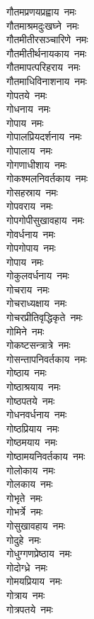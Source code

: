 \begin{multicols}{2}
\begin{flushleft}
गौतमप्रणयप्रह्वाय~नमः\\
गौतमाश्रमदुःखघ्ने~नमः\\
गौतमीतीरसञ्चारिणे~नमः\\
गौतमीतीर्थनायकाय~नमः\\
गौतमापत्परिहराय~नमः\\
गौतमाधिविनाशनाय~नमः\\
गोपतये~नमः\hfill{}\\
गोधनाय~नमः\\
गोपाय~नमः\\
गोपालप्रियदर्शनाय~नमः\\
गोपालाय~नमः\\
गोगणाधीशाय~नमः\\
गोकश्मलनिवर्तकाय~नमः\\
गोसहस्राय~नमः\\
गोपवराय~नमः\\
गोपगोपीसुखावहाय~नमः\\
गोवर्धनाय~नमः\hfill{}\\
गोपगोपाय~नमः\\
गोपाय~नमः\\
गोकुलवर्धनाय~नमः\\
गोचराय~नमः\\
गोचराध्यक्षाय~नमः\\
गोचरप्रीतिवृद्धिकृते~नमः\\
गोमिने~नमः\\
गोकष्टसन्त्रात्रे~नमः\\
गोसन्तापनिवर्तकाय~नमः\\
गोष्ठाय~नमः\hfill{}\\
गोष्ठाश्रयाय~नमः\\
गोष्ठपतये~नमः\\
गोधनवर्धनाय~नमः\\
गोष्ठप्रियाय~नमः\\
गोष्ठमयाय~नमः\\
गोष्ठामयनिवर्तकाय~नमः\\
गोलोकाय~नमः\\
गोलकाय~नमः\\
गोभृते~नमः\\
गोभर्त्रे~नमः\hfill{}\\
गोसुखावहाय~नमः\\
गोदुहे~नमः\\
गोधुग्गणप्रेष्ठाय~नमः\\
गोदोग्ध्रे~नमः\\
गोमयप्रियाय~नमः\\
गोत्राय~नमः\\
गोत्रपतये~नमः\\

\end{flushleft}
\end{multicols}
